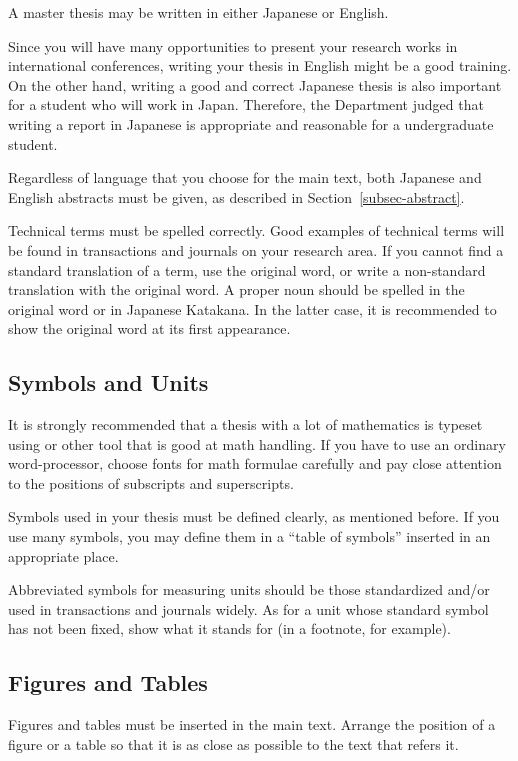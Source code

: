 A master thesis may be written in either {\EM Japanese or English}.

Since you will have many opportunities to present your research works in
international conferences, writing your thesis in English might be a good
training.  On the other hand, writing a good and correct Japanese thesis is
also important for a student who will work in Japan.  Therefore, the
Department judged that writing a report in Japanese is appropriate and
reasonable for a undergraduate student.

Regardless of language that you choose for the main text, {\EM both
Japanese and English abstracts} must be given, as described in
Section~\ref{subsec-abstract}.

Technical terms must be spelled correctly.  Good examples of technical terms
will be found in transactions and journals on your research area.  If you
cannot find a standard translation of a term, use the original word, or
write a non-standard translation with the original word.  A proper noun
should be spelled in the original word or in Japanese Katakana.  In the
latter case, it is recommended to show the original word at its first
appearance.

\subsection{Symbols and Units}\label{subsec-symbol}
It is strongly recommended that a thesis with a lot of mathematics is
typeset using \LATEX{} or other tool that is good at math handling.  If
you have to use an ordinary word-processor, choose fonts for math formulae
carefully and pay close attention to the positions of subscripts and
superscripts.

Symbols used in your thesis must be defined clearly, as mentioned before.
If you use many symbols, you may define them in a ``table of symbols''
inserted in an appropriate place.

Abbreviated symbols for measuring units should be those standardized
and\slash or used in transactions and journals widely.  As for a unit whose
standard symbol has not been fixed, show what it stands for (in a footnote,
for example).

\subsection{Figures and Tables}\label{subsec-figure}
Figures and tables must be inserted in the main text.  Arrange the position
of a figure or a table so that it is as close as possible to the text that
refers it.

